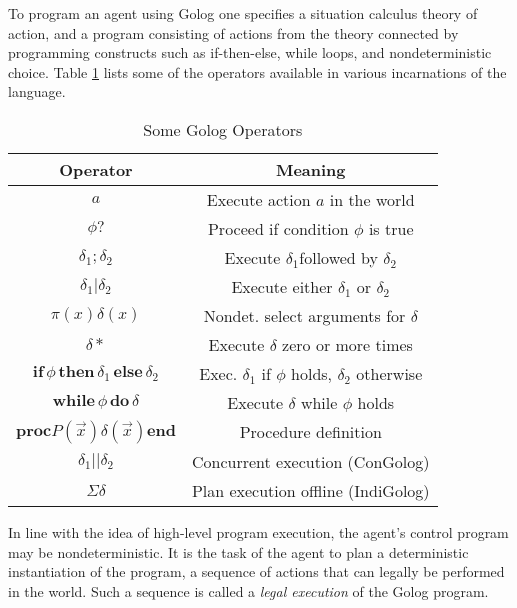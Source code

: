\documentclass[times, 10pt, twocolumn]{article}
\providecommand{\tabularnewline}{\\}
\begin{document}
To program an agent using Golog one specifies a situation calculus
theory of action, and a program consisting of actions from the theory
connected by programming constructs such as if-then-else, while loops,
and nondeterministic choice. Table \ref{tbl:Golog-Operators} lists
some of the operators available in various incarnations of the language.%
\begin{table}
\begin{centering}\begin{tabular}{|c|c|}
\hline 
Operator&
Meaning\tabularnewline
\hline
\hline 
$a$&
Execute action $a$ in the world\tabularnewline
\hline 
$\phi?$&
Proceed if condition $\phi$ is true\tabularnewline
\hline 
$\delta_{1};\delta_{2}$&
Execute $\delta_{1}$followed by $\delta_{2}$\tabularnewline
\hline 
$\delta_{1}|\delta_{2}$&
Execute either $\delta_{1}$ or $\delta_{2}$\tabularnewline
\hline 
$\pi(x)\delta(x)$&
Nondet. select arguments for $\delta$\tabularnewline
\hline 
$\delta*$&
Execute $\delta$ zero or more times\tabularnewline
\hline 
$\mathbf{if}\,\phi\,\mathbf{then}\,\delta_{1}\,\mathbf{else}\,\delta_{2}$&
Exec. $\delta_{1}$ if $\phi$ holds, $\delta_{2}$ otherwise\tabularnewline
\hline 
$\mathbf{while\,}\phi\mathbf{\, do}\,\delta$&
Execute $\delta$ while $\phi$ holds\tabularnewline
\hline 
$\mathbf{proc}P(\overrightarrow{x})\delta(\overrightarrow{x})\mathbf{end}$&
Procedure definition\tabularnewline
\hline 
$\delta_{1}||\delta_{2}$&
Concurrent execution (ConGolog)\tabularnewline
\hline 
$\Sigma\delta$&
Plan execution offline (IndiGolog)\tabularnewline
\hline
\end{tabular}\par\end{centering}

\caption{Some Golog Operators\label{tbl:Golog-Operators}}
\end{table}

In line with the idea of high-level program execution, the agent's
control program may be nondeterministic. It is the task of the agent
to plan a deterministic instantiation of the program, a sequence of
actions that can legally be performed in the world. Such a sequence
is called a \emph{legal execution} of the Golog program.
\end{document}
